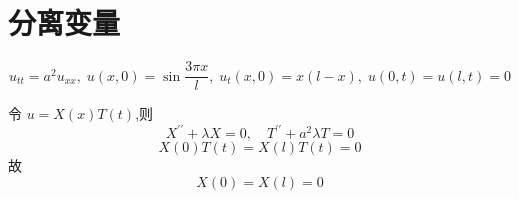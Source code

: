 \documentclass[../../PDE.tex]{subfiles}
\begin{document}
\ifSubfilesClassLoaded{
    \frontmatter

    \tableofcontents
    
    \mainmatter
}{}

\chapter{分离变量}

\begin{example}
    \[
    u_{tt}= a^{2}u_{x x },\;u\left( x,0 \right)=  \sin \frac{3\pi x }{l },\; u_{t}\left( x,0 \right)= x\left( l-x \right),\; u\left( 0,t \right)= u\left( l,t \right)= 0      
    \]
\end{example}
\begin{solution}
    令 \(  u= X\left( x \right)T\left( t \right)    \),则 \[
    X^{\prime \prime} +  \lambda X= 0,\quad T^{\prime \prime} + a^{2} \lambda T= 0
    \] \[
    X\left( 0 \right)T\left( t \right)= X\left( l \right)T\left( t \right)= 0    
    \]故 \[
    X\left( 0 \right)= X\left( l \right)= 0  
    \]


\end{solution}
\end{document}
